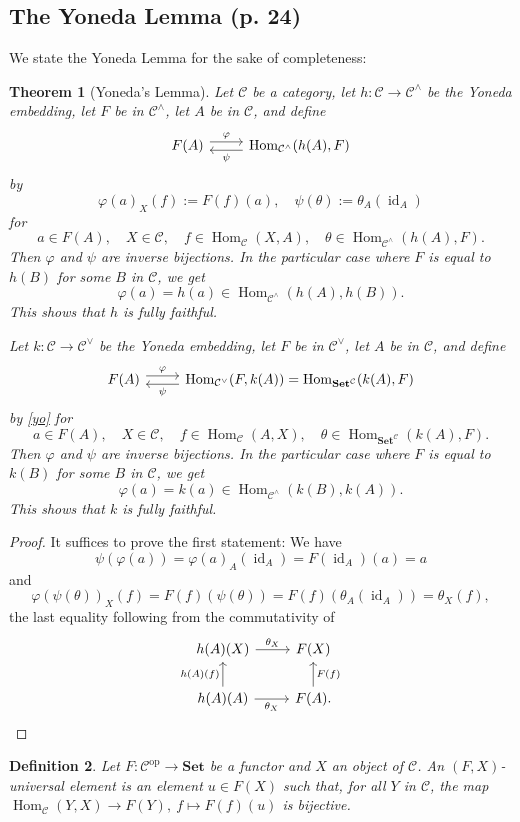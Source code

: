 \documentclass[12pt]{article}
\newtheorem{thm}{Theorem}
\newtheorem{df}[thm]{Definition}%
\theoremstyle{remark}
\theoremstyle{definition}
\newcommand{\C}{\mathcal C}
\newcommand{\Set}{\mathbf{Set}}
\newcommand{\pp}{\varphi}
\DeclareMathOperator{\id}{id}
\DeclareMathOperator{\Hom}{Hom}%
\DeclareMathOperator{\op}{op}
\begin{document}
\subsection{The Yoneda Lemma (p. 24)}
%
We state the Yoneda Lemma for the sake of completeness:
%
\begin{thm}[Yoneda's Lemma]\label{yol}
Let $\C$ be a category, let $h:\C\to\C^\wedge$ be the Yoneda embedding, let $F$ be in $\C^\wedge$, let $A$ be in $\C$, and define 
$$
\begin{tikzcd} 
F(A)\ar[yshift=0.7ex]{r}{\varphi}&\Hom_{\C^\wedge}(h(A),F)\ar[yshift=-0.7ex]{l}{\psi}
\end{tikzcd}
$$
by 
\begin{equation}\label{yo}
\varphi(a)_X(f):=F(f)(a),\quad\psi(\theta):=\theta_A(\id_A)
\end{equation}
for 
$$
a\in F(A),\quad X\in\C,\quad f\in\Hom_\C(X,A),\quad\theta\in\Hom_{\C^\wedge}(h(A),F).
$$ 
Then $\varphi$ and $\psi$ are inverse bijections. In the particular case where $F$ is equal to $h(B)$ for some $B$ in $\C$, we get 
$$
\varphi(a)=h(a)\in\Hom_{\C^\wedge}(h(A),h(B)).
$$
This shows that $h$ is fully faithful.

Let $k:\C\to\C^\vee$ be the Yoneda embedding, let $F$ be in $\C^\vee$, let $A$ be in $\C$, and define 
$$
\begin{tikzcd} 
F(A)\ar[yshift=0.7ex]{r}{\varphi}&\Hom_{\C^\vee}(F,k(A))=\Hom_{\Set^\C}(k(A),F)\ar[yshift=-0.7ex]{l}{\psi}
\end{tikzcd}
$$
by \eqref{yo} for 
$$
a\in F(A),\quad X\in\C,\quad f\in\Hom_\C(A,X),\quad\theta\in\Hom_{\Set^\C}(k(A),F).
$$ 
Then $\varphi$ and $\psi$ are inverse bijections. In the particular case where $F$ is equal to $k(B)$ for some $B$ in $\C$, we get 
$$
\varphi(a)=k(a)\in\Hom_{\C^\wedge}(k(B),k(A)).
$$
This shows that $k$ is fully faithful.
\end{thm}
%
\begin{proof}
It suffices to prove the first statement: We have 
$$
\psi(\pp(a))=\pp(a)_A(\id_A)=F(\id_A)(a)=a
$$ 
and
$$
\pp(\psi(\theta))_X(f)=F(f)(\psi(\theta))=F(f)(\theta_A(\id_A))=\theta_X(f),
$$ 
the last equality following from the commutativity of 
$$
\begin{tikzcd}
h(A)(X)\ar{r}{\theta_X}&F(X)\\ 
h(A)(A)\ar{u}{h(A)(f)}\ar{r}[swap]{\theta_X}&F(A).\ar{u}[swap]{F(f)}
\end{tikzcd}
$$
\end{proof}
%
\begin{df}\label{ue} 
Let $F:\C^{\op}\to\Set$ be a functor and $X$ an object of $\C$. An $(F,X)$-{\em universal element} is an element $u\in F(X)$ such that, for all $Y$ in $\C$, the map $\Hom_\C(Y,X)\to F(Y),\ f\mapsto F(f)(u)$ is bijective. 
\end{df}
\end{document}
